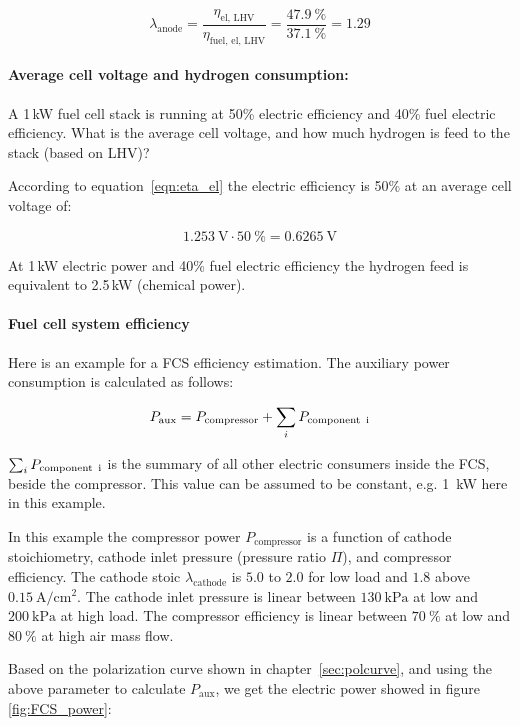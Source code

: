 \documentclass[11pt,a4paper,english,twoside]{scrreprt}
\begin{document}
\[
\lambda_\text{anode} = \frac{\eta_\text{el, LHV} }{\eta_\text{fuel, el, LHV}} = \frac{\SI{47.9}{\percent}}{\SI{37.1}{\percent}} = \num{1.29}
\]



\paragraph {Average cell voltage and hydrogen consumption:}

A 1\,kW fuel cell stack is running at 50\% electric efficiency and 40\% fuel electric efficiency. What is the average cell voltage, and how much hydrogen is feed to the stack (based on LHV)?

According to equation~\ref{eqn:eta_el} the electric efficiency is 50\% at an average cell voltage of:

\[
\SI{1.253}{\volt} \cdot \SI{50}{\percent} = \SI{0.6265}{\volt}
\]

At 1\,kW electric power and 40\% fuel electric efficiency the hydrogen feed is equivalent to 2.5\,kW (chemical power).


\paragraph{Fuel cell system efficiency}

Here is an example for a FCS efficiency estimation. The auxiliary power consumption is calculated as follows:

\[
P_\text{aux} = P_\text{compressor} + \sum_{i}P_\text{component\, i}
\]

$\sum_{i}P_\text{component\, i}$ is the summary of all other electric consumers inside the FCS, beside the compressor. This value can be assumed to be constant, e.g. 1~kW here in this example.

In this example the compressor power $P_\text{compressor}$ is a function of cathode stoichiometry, cathode inlet pressure (pressure ratio $\Pi$), and compressor efficiency. The cathode stoic $\lambda_\text{cathode}$ is $\num{5.0}$ to $\num{2.0}$ for low load and $\num{1.8}$ above $\SI{0.15}{\ampere\per\centi\meter\squared}$. The cathode inlet pressure is linear between $\SI{130}{\kPa}$ at low and $\SI{200}{\kPa}$ at high load. The compressor efficiency is linear between $\SI{70}{\%}$ at low and $\SI{80}{\%}$ at high air mass flow. 

Based on the polarization curve shown in chapter~\ref{sec:polcurve}, and using the above parameter to calculate $P_\text{aux}$, we get the electric power showed in figure \ref{fig:FCS_power}: 
\end{document}
